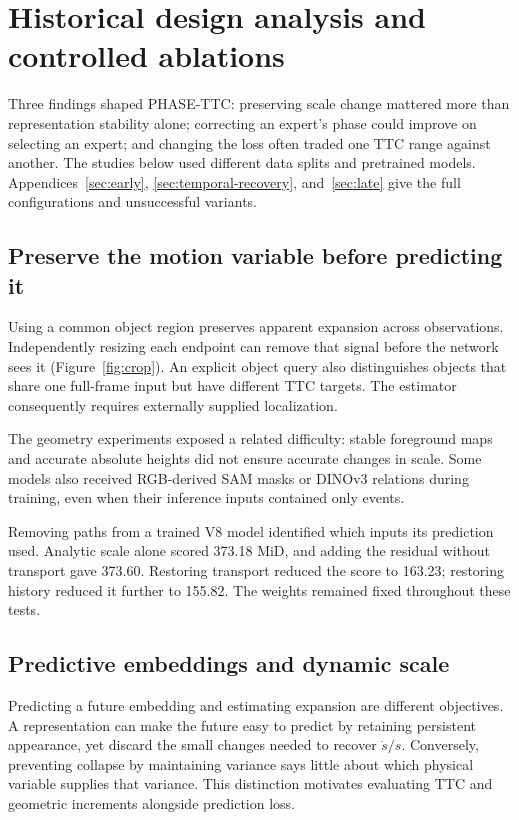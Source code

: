 \section{Historical design analysis and controlled ablations}
\label{app:design-history}
Three findings shaped PHASE-TTC: preserving scale change mattered more than representation stability alone; correcting an expert's phase could improve on selecting an expert; and changing the loss often traded one TTC range against another. The studies below used different data splits and pretrained models. Appendices~\ref{sec:early}, \ref{sec:temporal-recovery}, and~\ref{sec:late} give the full configurations and unsuccessful variants.

\subsection{Preserve the motion variable before predicting it}
Using a common object region preserves apparent expansion across observations. Independently resizing each endpoint can remove that signal before the network sees it (Figure~\ref{fig:crop}). An explicit object query also distinguishes objects that share one full-frame input but have different TTC targets. The estimator consequently requires externally supplied localization. 

The geometry experiments exposed a related difficulty: stable foreground maps and accurate absolute heights did not ensure accurate changes in scale. Some models also received RGB-derived SAM masks or DINOv3 relations during training, even when their inference inputs contained only events.

Removing paths from a trained V8 model identified which inputs its prediction used. Analytic scale alone scored 373.18 MiD, and adding the residual without transport gave 373.60. Restoring transport reduced the score to 163.23; restoring history reduced it further to 155.82. The weights remained fixed throughout these tests. 

\subsection{Predictive embeddings and dynamic scale}
Predicting a future embedding and estimating expansion are different objectives. A representation can make the future easy to predict by retaining persistent appearance, yet discard the small changes needed to recover $\dot s/s$. Conversely, preventing collapse by maintaining variance says little about which physical variable supplies that variance. This distinction motivates evaluating TTC and geometric increments alongside prediction loss.

